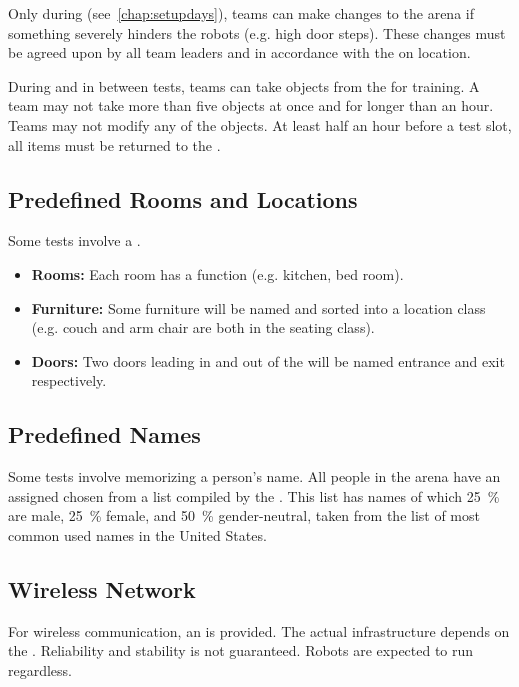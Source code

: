 \noindent Only during \SetupDays{} (see~\ref{chap:setupdays}), teams can make changes to the arena if something severely hinders the robots (e.g. high door steps). These changes must be agreed upon by all team leaders and in accordance with the \TC{} on location.

During \SetupDays{} and in between tests, teams can take objects from the \Arena{} for training. A team may not take more than five objects at once and for longer than an hour. Teams may not modify any of the objects. At least half an hour before a test slot, all items must be returned to the \Arena{}.


\subsection{Predefined Rooms and Locations}
\textit{\label{sec:rules:scenario:locations}}
Some tests involve a \PredefinedLocation{}.
\begin{itemize}
	\item \textbf{Rooms:} Each room has a function (e.g. kitchen, bed room).
	
	\item \textbf{Furniture:} Some furniture will be named and sorted into a location class (e.g. couch and arm chair are both in the seating class). 
	
	\item \textbf{Doors:} Two doors leading in and out of the \Arena{} will be named entrance and exit respectively.
\end{itemize}


\subsection{Predefined Names}
\label{sec:rules:scenario:names}
Some tests involve memorizing a person's name. All people in the arena have an assigned \PredefinedName{} chosen from a list compiled by the \TC{}. This list has \NumNames{} names of which \SI{25}{\percent} are male, \SI{25}{\percent} female, and \SI{50}{\percent} gender-neutral, taken from the list of most common used names in the United States.


\subsection{Wireless Network}
\label{sec:rules:scenario:wifi}

For wireless communication, an \ArenaNetwork{} is provided. The actual infrastructure depends on the \LOC{}. Reliability and stability is not guaranteed. Robots are expected to run regardless.

